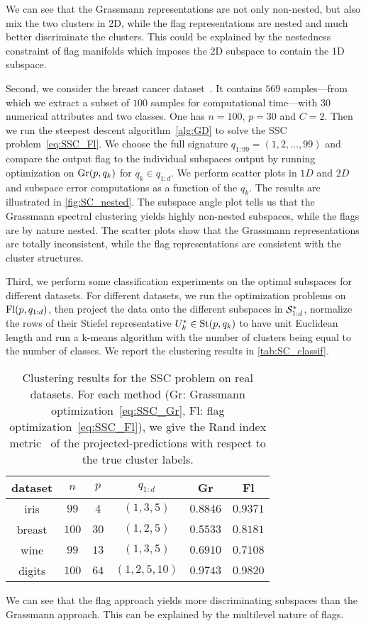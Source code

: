 We can see that the Grassmann representations are not only non-nested, but also mix the two clusters in 2D, while the flag representations are nested and much better discriminate the clusters. This could be explained by the nestedness constraint of flag manifolds which imposes the 2D subspace to contain the 1D subspace.

Second, we consider the breast cancer dataset~\citep{wolberg_breast_1995}.
It contains $569$ samples---from which we extract a subset of $100$ samples for computational time---with $30$ numerical attributes and two classes. One has $n = 100$, $p=30$ and $C = 2$. 
Then we run the steepest descent algorithm~\ref{alg:GD} to solve the SSC problem~\eqref{eq:SSC_Fl}.
We choose the full signature $q_{1:99} = (1, 2, \dots, 99)$ and compare the output flag to the individual subspaces output by running optimization on $\Gr(p, q_k)$ for $q_k \in q_{1:d}$.
We perform scatter plots in $1D$ and $2D$ and subspace error computations as a function of the $q_k$. The results are illustrated in \autoref{fig:SC_nested}.
The subspace angle plot tells us that the Grassmann spectral clustering yields highly non-nested subspaces, while the flags are by nature nested. The scatter plots show that the Grassmann representations are totally inconsistent, while the flag representations are consistent with the cluster structures.

Third, we perform some classification experiments on the optimal subspaces for different datasets. For different datasets, we run the optimization problems on $\Fl(p, q_{1:d})$, then project the data onto the different subspaces in $\S_{1:d}^*$, normalize the rows of their Stiefel representative $U_k^*\in\St(p, q_k)$ to have unit Euclidean length and run a k-means algorithm with the number of clusters being equal to the number of classes.
We report the clustering results in \autoref{tab:SC_classif}.
\begin{table*}
  \caption{
  Clustering results for the SSC problem on real datasets. For each method (Gr: Grassmann optimization~\eqref{eq:SSC_Gr}, Fl: flag optimization~\eqref{eq:SSC_Fl}), we give the Rand index metric~\citep{rand_objective_1971} of the projected-predictions with respect to the true cluster labels.}
  \label{tab:SC_classif}
  \centering
  \begin{tabular}{cccccc}
    \toprule
    dataset & $n$ & $p$ & $q_{1:d}$ & Gr & Fl\\
    \midrule
    iris & $99$ & $4$ & $(1, 3, 5)$ & $0.8846$ & $0.9371$ \\
    breast & $100$ & $30$ & $(1, 2, 5)$ & $0.5533$ & $0.8181$ \\
    wine & $99$ & $13$ & $(1, 3, 5)$ & $0.6910$ & $0.7108$ \\
    digits & $100$ & $64$ & $(1, 2, 5, 10)$ & $0.9743$ & $0.9820$ \\
    \bottomrule
  \end{tabular}
\end{table*}
We can see that the flag approach yields more discriminating subspaces than the Grassmann approach. This can be explained by the multilevel nature of flags.



